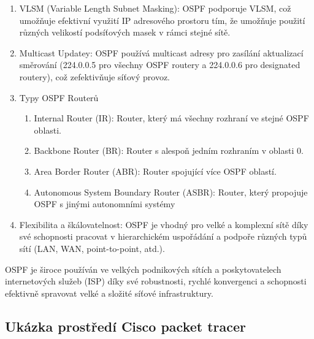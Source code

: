 \begin{enumerate}
    \item VLSM (Variable Length Subnet Masking): OSPF podporuje VLSM, což umožňuje efektivní využití IP adresového prostoru tím, že umožňuje použití různých velikostí podsíťových masek v rámci stejné sítě.
    \item Multicast Updatey: OSPF používá multicast adresy pro zasílání aktualizací směrování (224.0.0.5 pro všechny OSPF routery a 224.0.0.6 pro designated routery), což zefektivňuje síťový provoz.
    \item Typy OSPF Routerů
    \begin{enumerate}
        \item Internal Router (IR): Router, který má všechny rozhraní ve stejné OSPF oblasti.
        \item Backbone Router (BR): Router s alespoň jedním rozhraním v oblasti 0.
        \item Area Border Router (ABR): Router spojující více OSPF oblastí.
        \item Autonomous System Boundary Router (ASBR): Router, který propojuje OSPF s jinými autonomními systémy
    \end{enumerate}
    \item Flexibilita a škálovatelnost: OSPF je vhodný pro velké a komplexní sítě díky své schopnosti pracovat v hierarchickém uspořádání a podpoře různých typů sítí (LAN, WAN, point-to-point, atd.).
\end{enumerate}
OSPF je široce používán ve velkých podnikových sítích a poskytovatelech internetových služeb (ISP) díky své robustnosti, rychlé konvergenci a schopnosti efektivně spravovat velké a složité síťové infrastruktury.

\subsection{Ukázka prostředí Cisco packet tracer}
